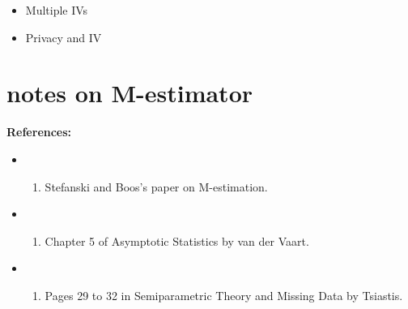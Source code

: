\documentclass[
]{book}
\providecommand{\tightlist}{%
  \setlength{\itemsep}{0pt}\setlength{\parskip}{0pt}}
\begin{document}
\begin{itemize}
\tightlist
\item
  Multiple IVs
\item
  Privacy and IV
\end{itemize}

\hypertarget{m-estimator}{%
\chapter{notes on M-estimator}\label{m-estimator}}

\textbf{References:}

\begin{itemize}
\item
  \begin{enumerate}
  \def\labelenumi{\arabic{enumi}.}
  \tightlist
  \item
    Stefanski and Boos's paper on M-estimation.
  \end{enumerate}
\item
  \begin{enumerate}
  \def\labelenumi{\arabic{enumi}.}
  \setcounter{enumi}{1}
  \tightlist
  \item
    Chapter 5 of Asymptotic Statistics by van der Vaart.
  \end{enumerate}
\item
  \begin{enumerate}
  \def\labelenumi{\arabic{enumi}.}
  \setcounter{enumi}{2}
  \tightlist
  \item
    Pages 29 to 32 in Semiparametric Theory and Missing Data by Tsiastis.
  \end{enumerate}
\end{itemize}

  
\end{document}
